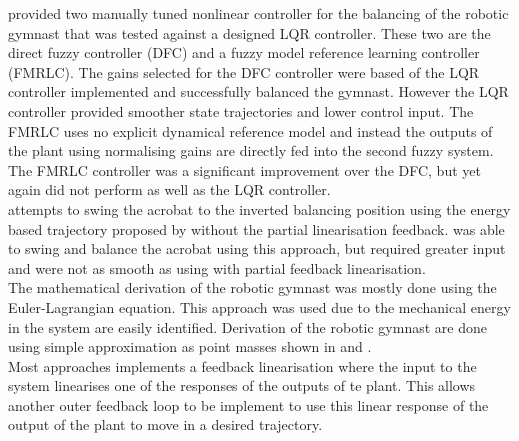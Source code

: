 \citet{Brown1997} provided two manually tuned nonlinear controller for the balancing of the robotic gymnast that was tested against a designed LQR controller. These two are the direct fuzzy controller (DFC) and a fuzzy model reference learning controller (FMRLC). The gains selected for the DFC controller were based of the LQR controller implemented and successfully balanced the gymnast. However the LQR controller provided smoother state trajectories and lower control input. The FMRLC uses no explicit dynamical reference model and instead the outputs of the plant using normalising gains are directly fed into the second fuzzy system. The FMRLC controller was a significant improvement over the DFC, but yet again did not perform as well as the LQR controller.\\

\citet{Brown1997} attempts to swing the acrobat to the inverted balancing position using the energy based trajectory proposed by \citet{spong_swingup} without the partial linearisation feedback. \citet{Brown1997} was able to swing and balance the acrobat using this approach, but required greater input and were not as smooth as using with partial feedback linearisation.\\

The mathematical derivation of the robotic gymnast was mostly done using the Euler-Lagrangian equation. This approach was used due to the  mechanical energy in the system are easily identified. Derivation of the robotic gymnast are done using simple approximation as point masses shown in \citep{derivation_controlPlaner} and \citep{tedrake}. \\

Most approaches implements a feedback linearisation where the input to the system linearises one of the responses of the outputs of te plant. This allows another outer feedback loop to be implement to use this linear response of the output of the plant to move in a desired trajectory.\\



